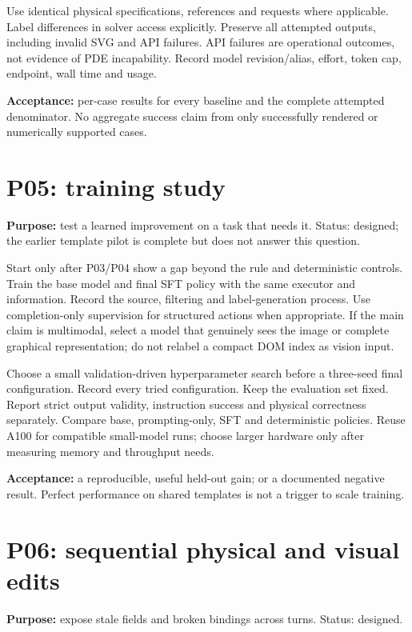 \documentclass[
  11pt,
  a4paper,
]{article}
\begin{document}
Use identical physical specifications, references and requests where
applicable. Label differences in solver access explicitly. Preserve all
attempted outputs, including invalid SVG and API failures. API failures
are operational outcomes, not evidence of PDE incapability. Record model
revision/alias, effort, token cap, endpoint, wall time and usage.

\textbf{Acceptance:} per-case results for every baseline and the
complete attempted denominator. No aggregate success claim from only
successfully rendered or numerically supported cases.

\section{P05: training study}\label{p05-training-study}

\textbf{Purpose:} test a learned improvement on a task that needs it.
Status: designed; the earlier template pilot is complete but does not
answer this question.

Start only after P03/P04 show a gap beyond the rule and deterministic
controls. Train the base model and final SFT policy with the same
executor and information. Record the source, filtering and
label-generation process. Use completion-only supervision for structured
actions when appropriate. If the main claim is multimodal, select a
model that genuinely sees the image or complete graphical
representation; do not relabel a compact DOM index as vision input.

Choose a small validation-driven hyperparameter search before a
three-seed final configuration. Record every tried configuration. Keep
the evaluation set fixed. Report strict output validity, instruction
success and physical correctness separately. Compare base,
prompting-only, SFT and deterministic policies. Reuse A100 for
compatible small-model runs; choose larger hardware only after measuring
memory and throughput needs.

\textbf{Acceptance:} a reproducible, useful held-out gain; or a
documented negative result. Perfect performance on shared templates is
not a trigger to scale training.

\section{P06: sequential physical and visual
edits}\label{p06-sequential-physical-and-visual-edits}

\textbf{Purpose:} expose stale fields and broken bindings across turns.
Status: designed.
\end{document}
